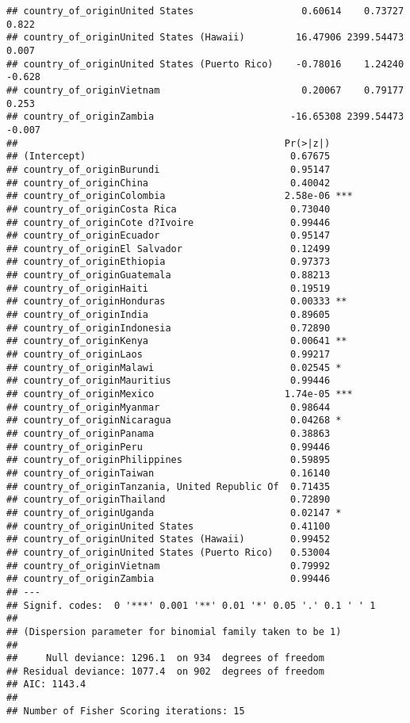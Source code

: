 \documentclass[
]{article}
\begin{document}
\begin{verbatim}
## country_of_originUnited States                   0.60614    0.73727   0.822
## country_of_originUnited States (Hawaii)         16.47906 2399.54473   0.007
## country_of_originUnited States (Puerto Rico)    -0.78016    1.24240  -0.628
## country_of_originVietnam                         0.20067    0.79177   0.253
## country_of_originZambia                        -16.65308 2399.54473  -0.007
##                                               Pr(>|z|)    
## (Intercept)                                    0.67675    
## country_of_originBurundi                       0.95147    
## country_of_originChina                         0.40042    
## country_of_originColombia                     2.58e-06 ***
## country_of_originCosta Rica                    0.73040    
## country_of_originCote d?Ivoire                 0.99446    
## country_of_originEcuador                       0.95147    
## country_of_originEl Salvador                   0.12499    
## country_of_originEthiopia                      0.97373    
## country_of_originGuatemala                     0.88213    
## country_of_originHaiti                         0.19519    
## country_of_originHonduras                      0.00333 ** 
## country_of_originIndia                         0.89605    
## country_of_originIndonesia                     0.72890    
## country_of_originKenya                         0.00641 ** 
## country_of_originLaos                          0.99217    
## country_of_originMalawi                        0.02545 *  
## country_of_originMauritius                     0.99446    
## country_of_originMexico                       1.74e-05 ***
## country_of_originMyanmar                       0.98644    
## country_of_originNicaragua                     0.04268 *  
## country_of_originPanama                        0.38863    
## country_of_originPeru                          0.99446    
## country_of_originPhilippines                   0.59895    
## country_of_originTaiwan                        0.16140    
## country_of_originTanzania, United Republic Of  0.71435    
## country_of_originThailand                      0.72890    
## country_of_originUganda                        0.02147 *  
## country_of_originUnited States                 0.41100    
## country_of_originUnited States (Hawaii)        0.99452    
## country_of_originUnited States (Puerto Rico)   0.53004    
## country_of_originVietnam                       0.79992    
## country_of_originZambia                        0.99446    
## ---
## Signif. codes:  0 '***' 0.001 '**' 0.01 '*' 0.05 '.' 0.1 ' ' 1
## 
## (Dispersion parameter for binomial family taken to be 1)
## 
##     Null deviance: 1296.1  on 934  degrees of freedom
## Residual deviance: 1077.4  on 902  degrees of freedom
## AIC: 1143.4
## 
## Number of Fisher Scoring iterations: 15
\end{verbatim}
\end{document}
